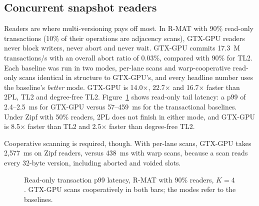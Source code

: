 \documentclass[sigconf,nonacm]{acmart}
\newcommand{\sys}{GTX-GPU}
\begin{document}
\subsection{Concurrent snapshot readers}
\label{sec:readers}
Readers are where multi-versioning pays off most. In R-MAT with 90\% read-only transactions (10\% of their operations
are adjacency scans), \sys{} readers never block writers, never abort and never wait. \sys{} commits 17.3~M
transactions/s with an overall abort ratio of 0.03\%, compared with 90\% for TL2. Each baseline was run in two modes,
per-lane scans and warp-cooperative read-only scans identical in structure to \sys{}'s, and every headline number uses
the baseline's \emph{better} mode. \sys{} is 14.0$\times$, 22.7$\times$ and 16.7$\times$ faster than 2PL, TL2 and
degree-free TL2. Figure~\ref{fig:latency} shows read-only tail latency: a p99 of 2.4--2.5~ms for \sys{} versus
57--459~ms for the transactional baselines. Under Zipf with 50\% readers, 2PL does not finish in either mode, and
\sys{} is 8.5$\times$ faster than TL2 and 2.5$\times$ faster than degree-free TL2.

Cooperative scanning is required, though. With per-lane scans, \sys{} takes 2,577~ms on Zipf readers, versus 438~ms
with warp scans, because a scan reads every 32-byte version, including aborted and voided slots.

\begin{figure}[t]
\centering
{}
\caption{Read-only transaction p99 latency, R-MAT with 90\% readers, $K{=}4$. \sys{} scans cooperatively in both
bars; the modes refer to the baselines.}
\label{fig:latency}
\end{figure}
\end{document}
